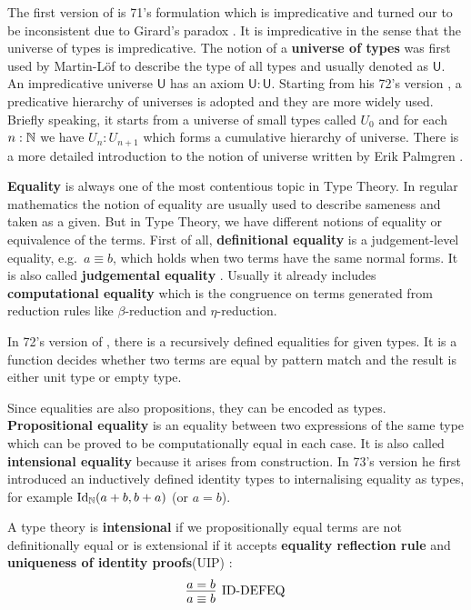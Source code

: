 The first version of \mltt is 71's formulation \cite{per:71} which is impredicative and turned our to be inconsistent due to Girard's paradox \cite{hurkens1995simplification}. It is impredicative in the sense that the universe of types is impredicative. The notion of a \textbf{universe of types} was first used by Martin-L\"{o}f \cite{Martin-Lof-1973} to describe the type of all types and usually denoted as $\mathsf{U}$. An impredicative universe $\mathsf{U}$ has an axiom $\mathsf{U} : \mathsf{U}$.
Starting from his 72's version \cite{Martin-Lof-1972}, a predicative hierarchy of universes is adopted and they are more widely used. Briefly speaking, it starts from a universe of small types called $U_0$ and for each $n : \mathbb{N}$ we have $U_n : U_{n+1}$ which forms a cumulative hierarchy of universe. There is a more detailed introduction to the notion of universe written by Erik Palmgren \cite{Palmgren98onuniverses}.


\textbf{Equality} is always one of the most contentious topic in Type Theory.
In regular mathematics the notion of equality are usually used to describe sameness and taken as a given.
But in Type Theory, we have different notions of equality or equivalence of the terms.
First of all, \textbf{definitional equality} is a judgement-level equality, e.g.\  $a \equiv b$, which holds when two terms have the same normal forms\cite{nor:90}. It is also called \textbf{judgemental equality} \cite{martin1984intuitionistic}. Usually it already includes \textbf{computational equality} which is the congruence on terms generated from reduction rules like $\beta$-reduction and $\eta$-reduction. 

In 72's version of \mltt, there is a recursively defined equalities for given types. It is a function decides whether two terms are equal by pattern match and the result is either unit type or empty type.

Since equalities are also propositions, they can be encoded as types. \textbf{Propositional equality} is an equality between two expressions of the same type which can be proved to be computationally equal in each case. It is also called \textbf{intensional equality} \cite{nor:90} because it arises from construction. In 73's version \cite{Martin-Lof-1973} he first introduced an inductively defined identity types to internalising equality as types, for example $\text{Id}_{\mathbb{N}}(a+b, b+a)$ (or $a = b$).


A type theory is \textbf{intensional} if we propositionally equal terms are not definitionally equal or is extensional if it accepts \textbf{equality reflection rule} and \textbf{uniqueness of identity proofs}(UIP) :
\begin{equation}
\label{reflection}
\infer[\text{ID-DEFEQ}]{a \equiv b}{a = b}
\end{equation}

